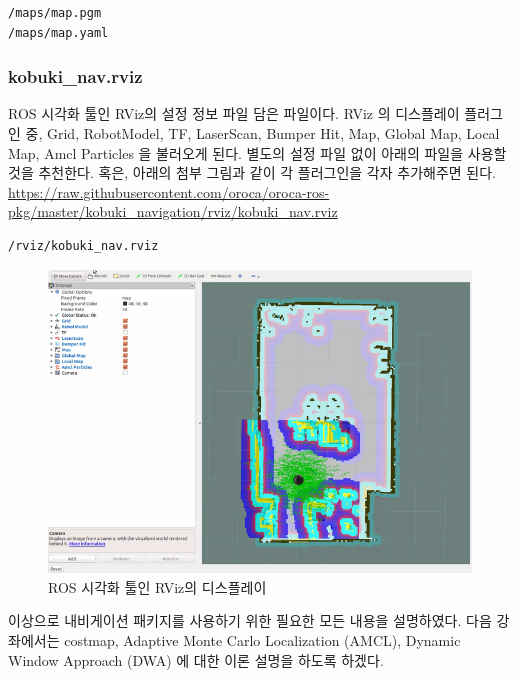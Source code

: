 \vspace{\baselineskip}
\begin{lstlisting}[language=ROS]
/maps/map.pgm
/maps/map.yaml
\end{lstlisting}

\subsubsection{kobuki\_nav.rviz}
ROS 시각화 툴인 RViz의 설정 정보 파일 담은 파일이다. RViz 의 디스플레이 플러그인 중, Grid, RobotModel, TF, LaserScan, Bumper Hit, Map, Global Map, Local Map, Amcl Particles 을 불러오게 된다. 별도의 설정 파일 없이 아래의 파일을 사용할 것을 추천한다. 혹은, 아래의 첨부 그림과 같이 각 플러그인을 각자 추가해주면 된다.\\

\url{https://raw.githubusercontent.com/oroca/oroca-ros-pkg/master/kobuki_navigation/rviz/kobuki_nav.rviz}

\vspace{\baselineskip}
\begin{lstlisting}[language=ROS]
/rviz/kobuki_nav.rviz
\end{lstlisting}

\begin{figure}[h]
\centering
\includegraphics[width=0.9\columnwidth]{pictures/chapter11/kobuki_nav_rviz.png}
\caption{ROS 시각화 툴인 RViz의 디스플레이}
\end{figure}

이상으로 내비게이션 패키지를 사용하기 위한 필요한 모든 내용을 설명하였다. 다음 강좌에서는 costmap, Adaptive Monte Carlo Localization (AMCL), Dynamic Window Approach (DWA) 에 대한 이론 설명을 하도록 하겠다.

